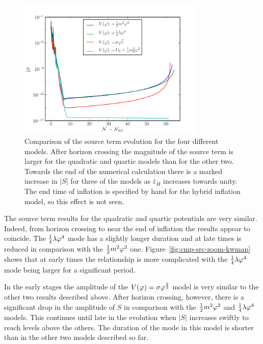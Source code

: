 \begin{figure}[htbp]
 \centering
 \includegraphics[width=0.8\textwidth]{numerical/graphs/cmp_src_kwmap-large}
 \caption[Comparison of Source Term for the Four Potentials]{Comparison of the
source term
evolution for the four different models. After horizon crossing the magnitude of the
source term is larger for the quadratic and quartic models than for the other two.
Towards the end of the numerical calculation there is a marked increase in $|S|$ for
three of the models as $\bar{\varepsilon}_H$ increases towards unity. The end time of
inflation is specified by hand for the hybrid inflation model, so this effect is
not seen.}
\label{fig:cmp-src-kwmap}
\end{figure}
% 

The source term results for the quadratic and quartic potentials are very similar.
Indeed, from horizon crossing to near the end of inflation the results appear to
coincide.
The $\frac{1}{4}\lambda\varphi^4$ mode has a slightly longer duration and at late times is reduced in comparison
with the $\frac{1}{2} m^2 \varphi^2$ one. Figure~\ref{fig:cmp-src-zoom-kwmap} shows that at early times the
relationship is more complicated with the $\frac{1}{4}\lambda\varphi^4$ mode being larger for a significant
period.

In the early stages the amplitude of the $V(\varphi)=\sigma\varphi^{\frac{2}{3}}$ model is very
similar to the other two
results described above. After horizon crossing, however, there is a significant drop
in the
amplitude of $S$ in comparison with the $\frac{1}{2} m^2 \varphi^2$ and $\frac{1}{4}\lambda\varphi^4$ models. This
continues
until late in the evolution when $|S|$ increases swiftly to reach levels above the
others.
The duration of the mode in this model is shorter than in the other two models
described so far. 

